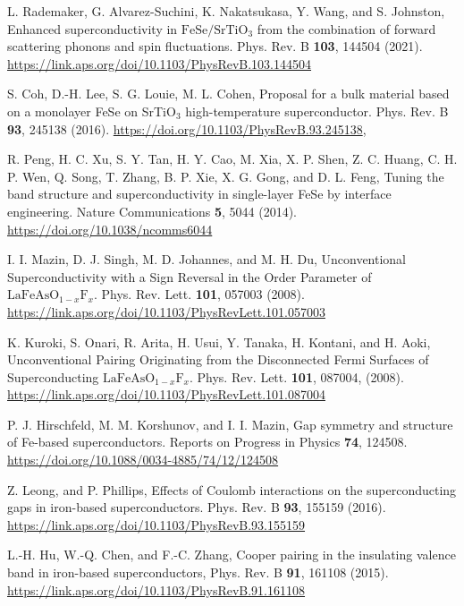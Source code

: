 \documentclass[prb,twocolumn,amsmath,amssymb,superscriptaddress,floatfix,nofootinbib]{revtex4-2}
\begin{document}
\begin{thebibliography}{}
L. Rademaker, G. Alvarez-Suchini, K. Nakatsukasa, Y. Wang, and S. Johnston, {Enhanced superconductivity in {$\mathrm{Fe}\mathrm{Se}/\mathrm{Sr}\mathrm{Ti}{\mathrm{O}}_{3}$} from the combination of forward scattering phonons and spin fluctuations}. 
{Phys. Rev. B} {\bf 103}, 144504 (2021). \url{https://link.aps.org/doi/10.1103/PhysRevB.103.144504}

S. Coh, D.-H. Lee, S. G. Louie, M. L. Cohen, {Proposal for a bulk material based on a monolayer {FeSe} on {SrTiO$_3$} high-temperature superconductor}. {Phys. Rev. B} {\bf 93}, {245138} (2016). \url{https://doi.org/10.1103/PhysRevB.93.245138},

R. Peng, H. C. Xu, S. Y. Tan, H. Y. Cao, M. Xia, X. P. Shen, Z. C. Huang, C. H. P. Wen, Q. Song, T. Zhang, B. P. Xie, X. G. Gong, and D. L. Feng, {Tuning the band structure and superconductivity in single-layer {FeSe} by interface engineering}. Nature Communications {\bf 5}, 5044 (2014). \url{https://doi.org/10.1038/ncomms6044}

I. I. Mazin, D. J. Singh, M. D. Johannes, and M. H. Du, {Unconventional Superconductivity with a Sign Reversal in the Order Parameter of {${\mathrm{LaFeAsO}}_{1\ensuremath{-}x}{\mathrm{F}}_{x}$}}. Phys. Rev. Lett. {\bf 101}, {057003} (2008). \url{https://link.aps.org/doi/10.1103/PhysRevLett.101.057003}

K. Kuroki, S. Onari, R. Arita, H. Usui, Y. Tanaka, H. Kontani, and H. Aoki, {Unconventional Pairing Originating from the Disconnected {Fermi} Surfaces of Superconducting {${\mathrm{LaFeAsO}}_{1\ensuremath{-}x}{\mathrm{F}}_{x}$}}. 
Phys. Rev. Lett. {\bf 101}, 087004,
(2008). \url{https://link.aps.org/doi/10.1103/PhysRevLett.101.087004}

P. J. Hirschfeld, M. M. Korshunov, and I. I. Mazin, {Gap symmetry and structure of {Fe}-based superconductors}. {Reports on Progress in Physics} {\bf 74}, {124508}. 
\url{https://doi.org/10.1088/0034-4885/74/12/124508}

Z. Leong, and P. Phillips, {Effects of Coulomb interactions on the superconducting gaps in iron-based superconductors}. Phys. Rev. B {\bf 93}, 155159 (2016). 
\url{https://link.aps.org/doi/10.1103/PhysRevB.93.155159}

L.-H. Hu, W.-Q. Chen, and F.-C. Zhang, {Cooper pairing in the insulating valence band in iron-based superconductors}, Phys. Rev. B {\bf 91}, 161108 (2015). \url{https://link.aps.org/doi/10.1103/PhysRevB.91.161108}


\end{thebibliography}
\end{document}
